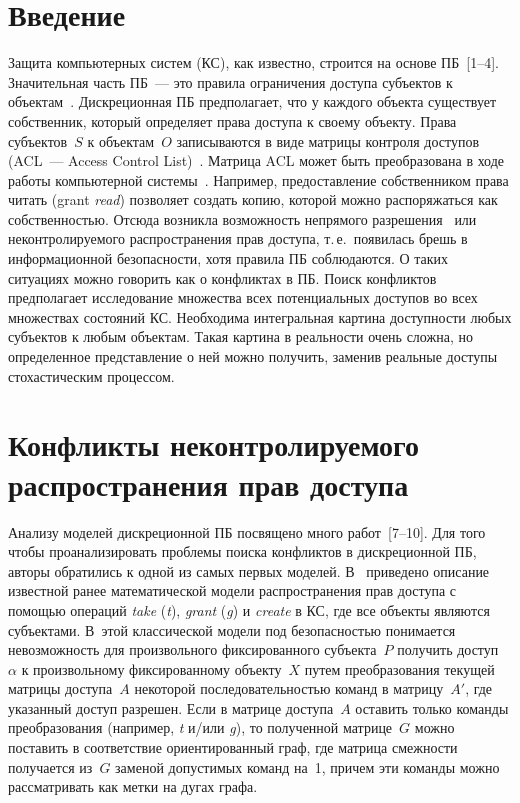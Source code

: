       \begin{multicols}{2}

      \label{st\stat}

\section{Введение}

Защита компьютерных систем (КС), как известно, строится на основе
ПБ~[1--4]. Значительная часть
ПБ~--- это правила ограничения доступа субъектов к объектам~\cite{b6}. 
Дискреционная ПБ предполагает, что у каждого объекта
существует собственник, который определяет права доступа к своему
объекту. Права субъектов~$S$ к объектам~$O$ записываются в виде
матрицы контроля доступов (ACL~--- Access Control List)~\cite{b2, b11}. Матрица  ACL может
быть преобразована в ходе работы компьютерной системы~\cite{b2, b11}. 
Например, предоставление собственником права читать (grant
\textit{read}) позволяет создать копию, которой можно распоряжаться
как собственностью. Отсюда возникла возможность непрямого разрешения~\cite{b9, b4} 
или не\-конт\-ро\-ли\-ру\-емо\-го распространения прав доступа, т.\,е.\
появилась брешь в информационной безопасности, хотя правила ПБ
соблюдаются. О таких ситуациях можно говорить как о конфликтах в ПБ.
Поиск конфликтов предполагает исследование множества всех
потенциальных доступов во всех множествах состояний КС. Необходима
интегральная картина доступности любых субъектов к любым объектам.
Такая картина в реальности очень сложна, но определенное
представление о ней можно получить, заменив реальные доступы
стохастическим процессом.
{

}

\section{Конфликты неконтролируемого распространения прав доступа}

Анализу моделей дискреционной ПБ посвящено много работ~[7--10]. 
Для того чтобы проанализировать проблемы
поиска конфликтов в дискреционной ПБ, авторы обратились к одной из
самых первых моделей. В~\cite{b2} приведено описание известной ранее
математической модели распространения прав доступа с помощью
операций \textit{take} (\textit{t}), \textit{grant} (\textit{g}) и
\textit{create} в КС, где все объекты являются субъектами. В~этой
классической модели под безопасностью понимается невозможность для
произвольного фиксированного субъекта~$P$ получить доступ~$\alpha$ к
произвольному фиксированному объекту~$X$ путем преобразования
текущей матрицы доступа~$A$ некоторой последовательностью команд в
матрицу~$A'$, где указанный доступ разрешен. Если в матрице доступа~$A$ 
оставить только команды преобразования (например, \textit{t} и/или
\textit{g}), то полученной матрице~$G$ можно поставить в соответствие
ориентированный граф, где матрица смежности получается из~$G$
заменой допустимых команд на~1, причем эти команды можно
рассматривать как метки на дугах графа.


\end{multicols}
